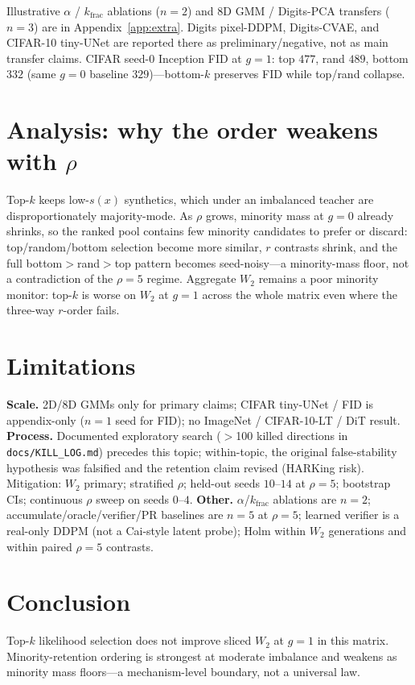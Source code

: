 \documentclass[11pt]{article}
\begin{document}
Illustrative $\alpha$ / $k_{\mathrm{frac}}$ ablations ($n{=}2$) and $8$D GMM / Digits-PCA transfers ($n{=}3$) are in Appendix~\ref{app:extra}.
Digits pixel-DDPM, Digits-CVAE, and CIFAR-10 tiny-UNet are reported there as preliminary/negative, not as main transfer claims.
CIFAR seed-$0$ Inception FID at $g{=}1$: top $477$, rand $489$, bottom $332$ (same $g{=}0$ baseline $329$)---bottom-$k$ preserves FID while top/rand collapse.

\section{Analysis: why the order weakens with $\rho$}
\label{sec:mech}
Top-$k$ keeps low-$s(x)$ synthetics, which under an imbalanced teacher are disproportionately majority-mode.
As $\rho$ grows, minority mass at $g{=}0$ already shrinks, so the ranked pool contains few minority candidates to prefer or discard: top/random/bottom selection become more similar, $r$ contrasts shrink, and the full bottom$>$rand$>$top pattern becomes seed-noisy---a minority-mass floor, not a contradiction of the $\rho{=}5$ regime.
Aggregate $W_2$ remains a poor minority monitor: top-$k$ is worse on $W_2$ at $g{=}1$ across the whole matrix even where the three-way $r$-order fails.

\section{Limitations}
\label{sec:limit}
\textbf{Scale.} 2D/8D GMMs only for primary claims; CIFAR tiny-UNet / FID is appendix-only ($n{=}1$ seed for FID); no ImageNet / CIFAR-10-LT / DiT result.
\textbf{Process.} Documented exploratory search ($>$100 killed directions in \texttt{docs/KILL\_LOG.md}) precedes this topic; within-topic, the original false-stability hypothesis was falsified and the retention claim revised (HARKing risk).
Mitigation: $W_2$ primary; stratified $\rho$; held-out seeds $10$--$14$ at $\rho{=}5$; bootstrap CIs; continuous $\rho$ sweep on seeds $0$--$4$.
\textbf{Other.} $\alpha$/$k_{\mathrm{frac}}$ ablations are $n{=}2$; accumulate/oracle/verifier/PR baselines are $n{=}5$ at $\rho{=}5$; learned verifier is a real-only DDPM (not a Cai-style latent probe); Holm within $W_2$ generations and within paired $\rho{=}5$ contrasts.

\section{Conclusion}
Top-$k$ likelihood selection does not improve sliced $W_2$ at $g{=}1$ in this matrix.
Minority-retention ordering is strongest at moderate imbalance and weakens as minority mass floors---a mechanism-level boundary, not a universal law.
\end{document}
